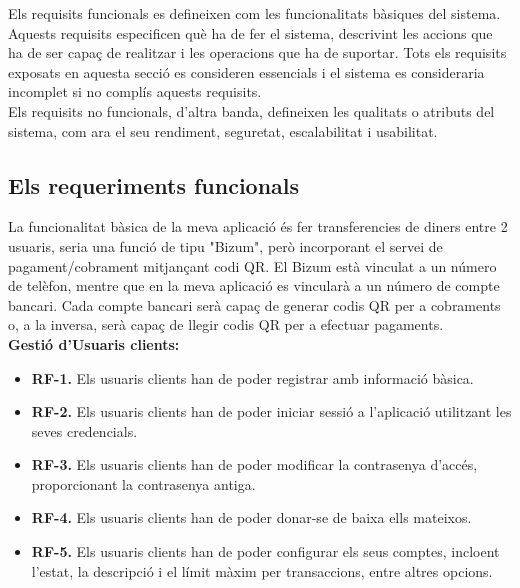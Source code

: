 \documentclass[a4paper,12pt,twoside]{ThesisStyle}
\begin{document}
Els requisits funcionals es defineixen com les funcionalitats bàsiques del sistema. Aquests requisits especificen què ha de fer el sistema, descrivint les accions que ha de ser capaç de realitzar i les operacions que ha de suportar. Tots els requisits exposats en aquesta secció es consideren essencials i el sistema es consideraria incomplet si no complís aquests requisits.\\

Els requisits no funcionals, d'altra banda, defineixen les qualitats o atributs del sistema, com ara el seu rendiment, seguretat, escalabilitat i usabilitat.




\subsection{Els requeriments funcionals }
\label{subsec:Els requeriments funcionals}


La funcionalitat bàsica de la meva aplicació és fer transferencies de diners entre 2 usuaris, 
seria una funció de tipu "Bizum", però incorporant el servei de pagament/cobrament mitjançant codi QR. El Bizum està vinculat a un número de telèfon, mentre que en la meva aplicació es vincularà a un número de compte bancari. Cada compte bancari serà capaç de generar codis QR per a cobraments o, a la inversa, serà capaç de llegir codis QR per a efectuar pagaments.\\



\textbf{Gestió d'Usuaris clients:}
\begin{itemize}
    \item \textbf{RF-1.} Els usuaris clients han de poder registrar amb informació bàsica.
    \item \textbf{RF-2.} Els usuaris clients han de poder iniciar sessió a l'aplicació utilitzant les seves credencials.
    \item \textbf{RF-3.} Els usuaris clients han de poder modificar la contrasenya d'accés, proporcionant la contrasenya antiga.
    \item \textbf{RF-4.} Els usuaris clients han de poder donar-se de baixa ells mateixos.
    \item \textbf{RF-5.} Els usuaris clients han de poder configurar els seus comptes, incloent l'estat, la descripció i el límit màxim per transaccions, entre altres opcions.
\end{itemize}
\end{document}
